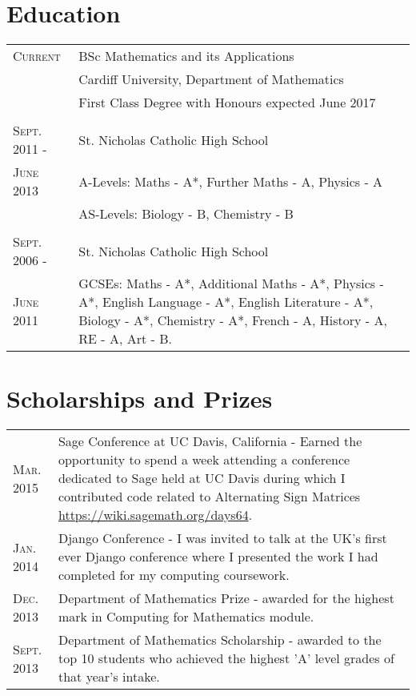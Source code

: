 \documentclass[a4paper]{article}
\begin{document}
\section{Education}
\begin{tabularx}{\textwidth}{lX}
\textsc{Current} & \textsc BSc Mathematics and its Applications \\
&\normalsize Cardiff University, Department of Mathematics\\
& First Class Degree with Honours expected June 2017 \\
\\
\textsc{Sept. 2011 -} & St. Nicholas Catholic High School\\
\textsc{June 2013} & A-Levels: Maths - A*, Further Maths - A, Physics - A\\
& AS-Levels: Biology - B, Chemistry - B\\
\\
\textsc{Sept. 2006 -} & St. Nicholas Catholic High School\\
\textsc{June 2011} & GCSEs: Maths - A*, Additional Maths - A*, Physics - A*, English Language - A*, English Literature - A*, Biology - A*, Chemistry - A*, French - A, History - A, RE - A, Art - B.\\
\end{tabularx}

\section{Scholarships and Prizes}
\begin{tabularx}{\textwidth}{lX}
\textsc{Mar.} 2015 & Sage Conference at UC Davis, California - Earned the opportunity to spend a week attending a conference dedicated to Sage held at UC Davis during which I contributed code related to Alternating Sign Matrices \url{https://wiki.sagemath.org/days64}.\\
\textsc{Jan.} 2014 & Django Conference - I was invited to talk at the UK's first ever Django conference where I presented the work I had completed for my computing coursework.\\
\textsc{Dec.} 2013 & Department of Mathematics Prize - awarded for the highest mark in Computing for Mathematics module.\\
\textsc{Sept.} 2013 & Department of Mathematics Scholarship - awarded to the top 10 students who achieved the highest 'A' level grades of that year's intake.\\
\end{tabularx}
\end{document}
